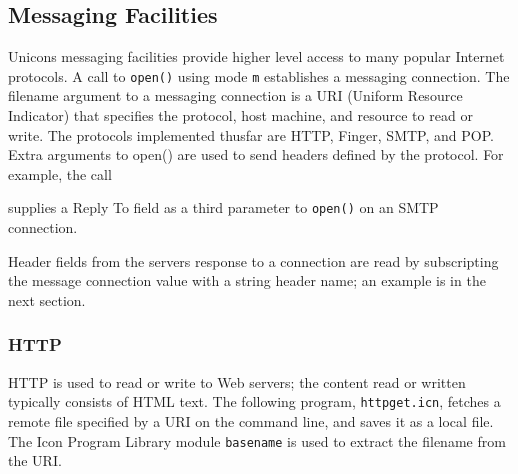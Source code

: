 \subsection{Messaging Facilities}

Unicon{\textquotesingle}s messaging facilities provide
higher level access to many popular Internet protocols. A call to
\texttt{open()} using mode \texttt{{\textquotedbl}m{\textquotedbl}}
establishes a messaging connection. The filename argument to a
messaging connection is a URI (Uniform Resource Indicator) that
specifies the protocol, host machine, and resource to read or write.
The protocols implemented thusfar are HTTP, Finger, SMTP, and POP.
Extra arguments to open() are used to send headers defined by the
protocol. For example, the call


\noindent
supplies a Reply To field as a third parameter to \texttt{open()} on an
SMTP connection.

Header fields from the server{\textquotesingle}s response to a
connection are read by subscripting the message connection value
with a string header name; an example is in the next section.

\subsubsection{HTTP}

HTTP is used to read or write to Web servers; the content
read or written typically consists of HTML text. The
following program, \texttt{httpget.icn}, fetches a remote file
specified by a URI on the command line, and saves it as a local file.
The Icon Program Library module \texttt{basename} is used to extract
the filename from the URI.



